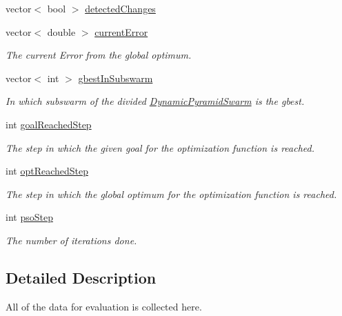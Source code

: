 \begin{CompactItemize}
vector$<$ bool $>$ \hyperlink{classPsoStatistics_003f8a7beb9d9f89fb3d035d018b18a4}{detectedChanges}
\item 
vector$<$ double $>$ \hyperlink{classPsoStatistics_7e0361a41053ac76931c909d97831487}{currentError}
\begin{CompactList}\small\item\em The current Error from the global optimum. \item\end{CompactList}\item 
vector$<$ int $>$ \hyperlink{classPsoStatistics_3b08f43d32d136b9cf3eac9001d7e6de}{gbestInSubswarm}
\begin{CompactList}\small\item\em In which subswarm of the divided \hyperlink{classDynamicPyramidSwarm}{DynamicPyramidSwarm} is the gbest. \item\end{CompactList}\item 
int \hyperlink{classPsoStatistics_d4b9e6fa2b084958183b90d555103b15}{goalReachedStep}
\begin{CompactList}\small\item\em The step in which the given goal for the optimization function is reached. \item\end{CompactList}\item 
int \hyperlink{classPsoStatistics_714187ea1f5645543c0250d19018d344}{optReachedStep}
\begin{CompactList}\small\item\em The step in which the global optimum for the optimization function is reached. \item\end{CompactList}\item 
int \hyperlink{classPsoStatistics_6f6a1e27328b88d53224fa45138bb1ef}{psoStep}
\begin{CompactList}\small\item\em The number of iterations done. \item\end{CompactList}\end{CompactItemize}


\subsection{Detailed Description}
All of the data for evaluation is collected here. 

